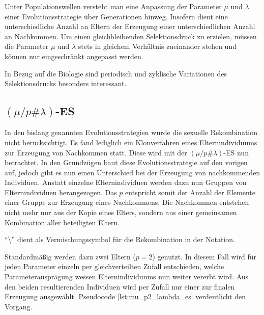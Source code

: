 Unter Populationswellen versteht man eine Anpassung der Parameter $\mu$ und $\lambda$ einer Evolutionsstrategie über Generationen hinweg. Insofern dient eine unterschiedliche Anzahl an Eltern der Erzeugung einer unterschiedlichen Anzahl an Nachkommen.
Um einen gleichbleibenden Selektionsdruck zu erzielen, müssen die Parameter $\mu$ und $\lambda$ stets in gleichem Verhältnis zueinander stehen und können nur eingeschränkt angepasst werden.

In Bezug auf die Biologie sind periodisch und zyklische Variationen des Selektionsdrucks besonders interessant.

\subsection{$(\mu / p \# \lambda)$-ES}

In den bislang genannten Evolutionsstrategien wurde die sexuelle Rekombination nicht berücksichtigt. Es fand lediglich ein Klonverfahren eines Elternindividuums zur Erzeugung von Nachkommen statt.
Diese wird mit der $(\mu / p \# \lambda)$-ES nun betrachtet.
In den Grundzügen baut diese Evolutionsstrategie auf den vorigen auf, jedoch gibt es nun einen Unterschied bei der Erzeugung von nachkommenden Individuen.
Anstatt einzelne Elternindividuen werden dazu nun Gruppen von Elternindividuen herangezogen.
Das $p$ entspricht somit der Anzahl der Elemente einer Gruppe zur Erzeugung eines Nachkommens.
Die Nachkommen entstehen nicht mehr nur aus der Kopie eines Elters, sondern aus einer gemeinsamen Kombination aller beteiligten Eltern.

\enquote{\textbackslash} dient als Vermischungssymbol für die Rekombination in der Notation.

Standardmäßig werden dazu zwei Eltern ($p = 2$) genutzt.
In diesem Fall wird für jeden Parameter einzeln per gleichverteilten Zufall entschieden, welche Parameterausprägung wessen Elternindividuums nun weiter vererbt wird.
Aus den beiden resultierenden Individuen wird per Zufall nur einer zur finalen Erzeugung ausgewählt.
Pseudocode \ref{lst:mu_p2_lambda_es} verdeutlicht den Vorgang.

